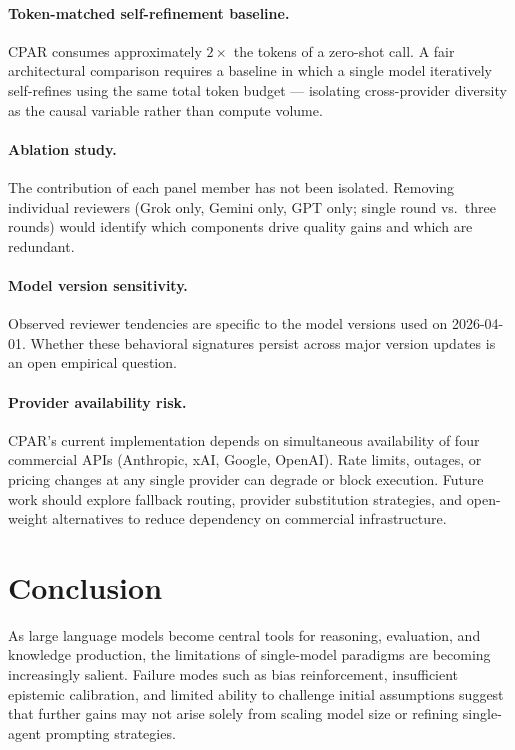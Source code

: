 \documentclass[11pt, a4paper]{article}
\begin{document}
\paragraph{Token-matched self-refinement baseline.} CPAR consumes approximately $2\times$ the tokens of a zero-shot call. A fair architectural comparison requires a baseline in which a single model iteratively self-refines using the same total token budget --- isolating cross-provider diversity as the causal variable rather than compute volume.

\paragraph{Ablation study.} The contribution of each panel member has not been isolated. Removing individual reviewers (Grok only, Gemini only, GPT only; single round vs.\ three rounds) would identify which components drive quality gains and which are redundant.

\paragraph{Model version sensitivity.} Observed reviewer tendencies are specific to the model versions used on 2026-04-01. Whether these behavioral signatures persist across major version updates is an open empirical question.

\paragraph{Provider availability risk.} CPAR's current implementation depends on simultaneous availability of four commercial APIs (Anthropic, xAI, Google, OpenAI). Rate limits, outages, or pricing changes at any single provider can degrade or block execution. Future work should explore fallback routing, provider substitution strategies, and open-weight alternatives to reduce dependency on commercial infrastructure.

\section{Conclusion}
\label{sec:conclusion}

As large language models become central tools for reasoning, evaluation, and knowledge production, the limitations of single-model paradigms are becoming increasingly salient. Failure modes such as bias reinforcement, insufficient epistemic calibration, and limited ability to challenge initial assumptions suggest that further gains may not arise solely from scaling model size or refining single-agent prompting strategies.
\end{document}
